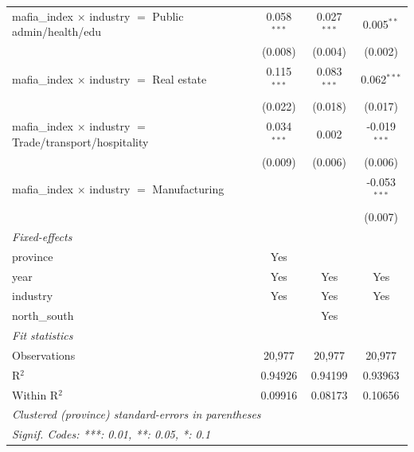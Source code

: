 \begin{tabular}{lccc}
   mafia\_index $\times$ industry $=$ Public admin/health/edu       & 0.058$^{***}$ & 0.027$^{***}$  & 0.005$^{**}$\\   
                                                                    & (0.008)       & (0.004)        & (0.002)\\   
   mafia\_index $\times$ industry $=$ Real estate                   & 0.115$^{***}$ & 0.083$^{***}$  & 0.062$^{***}$\\   
                                                                    & (0.022)       & (0.018)        & (0.017)\\   
   mafia\_index $\times$ industry $=$ Trade/transport/hospitality   & 0.034$^{***}$ & 0.002          & -0.019$^{***}$\\   
                                                                    & (0.009)       & (0.006)        & (0.006)\\   
   mafia\_index $\times$ industry $=$ Manufacturing                 &               &                & -0.053$^{***}$\\   
                                                                    &               &                & (0.007)\\   
   \midrule
   \emph{Fixed-effects}\\
   province                                                         & Yes           &                & \\  
   year                                                             & Yes           & Yes            & Yes\\  
   industry                                                         & Yes           & Yes            & Yes\\  
   north\_south                                                     &               & Yes            & \\  
   \midrule
   \emph{Fit statistics}\\
   Observations                                                     & 20,977        & 20,977         & 20,977\\  
   R$^2$                                                            & 0.94926       & 0.94199        & 0.93963\\  
   Within R$^2$                                                     & 0.09916       & 0.08173        & 0.10656\\  
   \midrule \midrule
   \multicolumn{4}{l}{\emph{Clustered (province) standard-errors in parentheses}}\\
   \multicolumn{4}{l}{\emph{Signif. Codes: ***: 0.01, **: 0.05, *: 0.1}}\\
\end{tabular}
\par\endgroup


